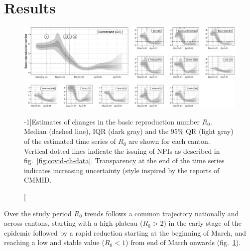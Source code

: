 \section{Results}
\begin{figure}\centering
  \includegraphics[width=\textwidth]{fig_covid-switzerland-npi/FIGURE_2.png}
  \caption[Estimates of changes in the basic reproduction number $R_0$][-1\baselineskip]{Estimates of changes in the basic reproduction number $R_0$. Median (dashed line), IQR (dark gray) and the 95\% QR (light gray) of the estimated time series of $R_0$ are shown for each canton. Vertical dotted lines indicate the issuing of NPIs as described in fig.~\ref{fig:covid-ch-data}. Transparency at the end of the time series indicates increasing uncertainty (style inspired by the reports of CMMID.}
  \label{fig:covid-ch-r0}
\end{figure}
Over the study period $R_0$ trends follows a common trajectory nationally and across cantons, starting with a high plateau ($R_0 >2$) in the early stage of the epidemic followed by a rapid reduction starting at the beginning of March, and reaching a low and stable value ($R_0 <1$) from end of March onwards (fig.~\ref{fig:covid-ch-r0}). 

